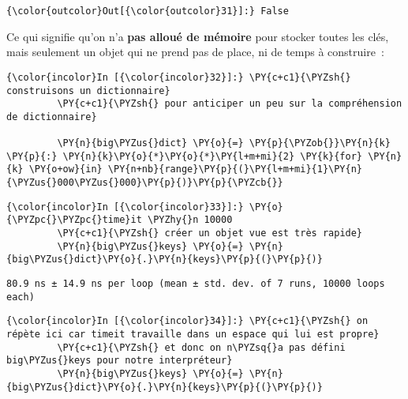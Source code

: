 \begin{Verbatim}[commandchars=\\\{\},frame=single,framerule=0.3mm,rulecolor=\color{cellframecolor}]
{\color{outcolor}Out[{\color{outcolor}31}]:} False
\end{Verbatim}
            
    Ce qui signifie qu'on n'a \textbf{pas alloué de mémoire} pour stocker
toutes les clés, mais seulement un objet qui ne prend pas de place, ni
de temps à construire~:

    \begin{Verbatim}[commandchars=\\\{\},frame=single,framerule=0.3mm,rulecolor=\color{cellframecolor}]
{\color{incolor}In [{\color{incolor}32}]:} \PY{c+c1}{\PYZsh{} construisons un dictionnaire}
         \PY{c+c1}{\PYZsh{} pour anticiper un peu sur la compréhension de dictionnaire}
         
         \PY{n}{big\PYZus{}dict} \PY{o}{=} \PY{p}{\PYZob{}}\PY{n}{k} \PY{p}{:} \PY{n}{k}\PY{o}{*}\PY{o}{*}\PY{l+m+mi}{2} \PY{k}{for} \PY{n}{k} \PY{o+ow}{in} \PY{n+nb}{range}\PY{p}{(}\PY{l+m+mi}{1}\PY{n}{\PYZus{}000\PYZus{}000}\PY{p}{)}\PY{p}{\PYZcb{}}
\end{Verbatim}


    \begin{Verbatim}[commandchars=\\\{\},frame=single,framerule=0.3mm,rulecolor=\color{cellframecolor}]
{\color{incolor}In [{\color{incolor}33}]:} \PY{o}{\PYZpc{}\PYZpc{}time}it \PYZhy{}n 10000
         \PY{c+c1}{\PYZsh{} créer un objet vue est très rapide}
         \PY{n}{big\PYZus{}keys} \PY{o}{=} \PY{n}{big\PYZus{}dict}\PY{o}{.}\PY{n}{keys}\PY{p}{(}\PY{p}{)}
\end{Verbatim}


    \begin{Verbatim}[commandchars=\\\{\},frame=single,framerule=0.3mm,rulecolor=\color{cellframecolor}]
80.9 ns ± 14.9 ns per loop (mean ± std. dev. of 7 runs, 10000 loops each)
\end{Verbatim}

    \begin{Verbatim}[commandchars=\\\{\},frame=single,framerule=0.3mm,rulecolor=\color{cellframecolor}]
{\color{incolor}In [{\color{incolor}34}]:} \PY{c+c1}{\PYZsh{} on répète ici car timeit travaille dans un espace qui lui est propre}
         \PY{c+c1}{\PYZsh{} et donc on n\PYZsq{}a pas défini big\PYZus{}keys pour notre interpréteur}
         \PY{n}{big\PYZus{}keys} \PY{o}{=} \PY{n}{big\PYZus{}dict}\PY{o}{.}\PY{n}{keys}\PY{p}{(}\PY{p}{)}
\end{Verbatim}


